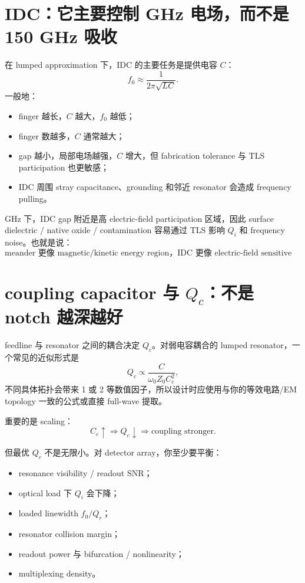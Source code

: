 \documentclass[11pt,a4paper,openany]{ctexrep}
\begin{document}
\section{IDC：它主要控制 GHz 电场，而不是 150 GHz 吸收}

在 lumped approximation 下，IDC 的主要任务是提供电容 $C$：
\[
f_0\approx\frac{1}{2\pi\sqrt{LC}}.
\]
一般地：
\begin{itemize}
  \item finger 越长，$C$ 越大，$f_0$ 越低；
  \item finger 数越多，$C$ 通常越大；
  \item gap 越小，局部电场越强，$C$ 增大，但 fabrication tolerance 与 TLS participation 也更敏感；
  \item IDC 周围 stray capacitance、grounding 和邻近 resonator 会造成 frequency pulling。
\end{itemize}

GHz 下，IDC gap 附近是高 electric-field participation 区域，因此 surface dielectric / native oxide / contamination 容易通过 TLS 影响 $Q_i$ 和 frequency noise。也就是说：
\[
\boxed{
\text{meander 更像 magnetic/kinetic energy region，IDC 更像 electric-field sensitive region。}
}
\]

\section{coupling capacitor 与 $Q_c$：不是 notch 越深越好}

feedline 与 resonator 之间的耦合决定 $Q_c$。对弱电容耦合的 lumped resonator，一个常见的近似形式是
\[
Q_c\propto\frac{C}{\omega_0 Z_0 C_c^2},
\]
不同具体拓扑会带来 1 或 2 等数值因子，所以设计时应使用与你的等效电路/EM topology 一致的公式或直接 full-wave 提取。

重要的是 scaling：
\[
C_c\uparrow\Rightarrow Q_c\downarrow\Rightarrow\text{coupling stronger}.
\]

但最优 $Q_c$ 不是无限小。对 detector array，你至少要平衡：
\begin{itemize}
  \item resonance visibility / readout SNR；
  \item optical load 下 $Q_i$ 会下降；
  \item loaded linewidth $f_0/Q_r$；
  \item resonator collision margin；
  \item readout power 与 bifurcation / nonlinearity；
  \item multiplexing density。
\end{itemize}
\end{document}
